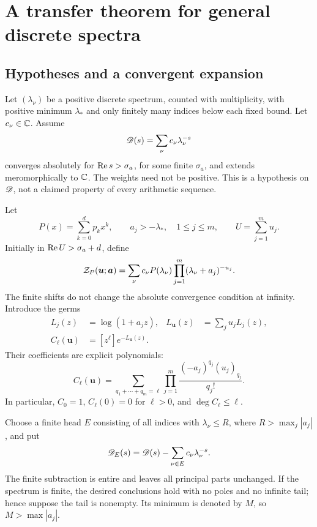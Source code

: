 \section{A transfer theorem for general discrete spectra}
\label{asj:sec:transfer}

\subsection{Hypotheses and a convergent expansion}
Let $(\lambda_\nu)$ be a positive discrete spectrum, counted with multiplicity,
with positive minimum $\lambda_*$ and only finitely many indices below each
fixed bound. Let $c_\nu\in\mathbb C$. Assume
\begin{equation}\label{asj:eq:base}
 \mathscr D(s)=\sum_\nu c_\nu\lambda_\nu^{-s}
\end{equation}
converges absolutely for $\operatorname{Re} s>\sigma_a$, for some finite $\sigma_a$, and
extends meromorphically to $\mathbb C$. The weights need not be positive. This is a
hypothesis on $\mathscr D$, not a claimed property of every arithmetic sequence.

Let
\[
 P(x)=\sum_{k=0}^{d}p_kx^k,
 \qquad a_j> -\lambda_*,\quad 1\le j\le m,
 \qquad U=\sum_{j=1}^m u_j.
\]
Initially in $\operatorname{Re} U>\sigma_a+d$, define
\begin{equation}\label{asj:eq:Zdef}
 \mathcal Z_P(\boldsymbol u;\boldsymbol a)
 =\sum_\nu c_\nu P(\lambda_\nu)
                   \prod_{j=1}^m(\lambda_\nu+a_j)^{-u_j}.
\end{equation}
The finite shifts do not change the absolute convergence condition at infinity.
Introduce the germs
\begin{align}
 L_j(z)&=\log(1+a_jz),&
 L_{\boldsymbol u}(z)&=\sum_j u_j L_j(z),\label{asj:eq:Ldef}\\
 C_\ell(\boldsymbol u)&=[z^\ell]e^{-L_{\boldsymbol u}(z)}.
 \label{asj:eq:Cdef}
\end{align}
Their coefficients are explicit polynomials:
\begin{equation}\label{asj:eq:Cpoch}
 C_\ell(\boldsymbol u)=
 \sum_{q_1+\cdots+q_m=\ell}
    \prod_{j=1}^m\frac{(-a_j)^{q_j}(u_j)_{q_j}}{q_j!}.
\end{equation}
In particular, $C_0=1$, $C_\ell(0)=0$ for $\ell>0$, and
$\deg C_\ell\le\ell$.

Choose a finite head $E$ consisting of all indices with $\lambda_\nu\le R$,
where $R>\max_j|a_j|$, and put
\[
 \mathscr D_E(s)=\mathscr D(s)-\sum_{\nu\in E}c_\nu\lambda_\nu^{-s}.
\]
The finite subtraction is entire and leaves all principal parts unchanged.
If the spectrum is finite, the desired conclusions hold with no poles and
no infinite tail; hence suppose the tail is nonempty. Its minimum is denoted
by $M$, so $M>\max|a_j|$.

